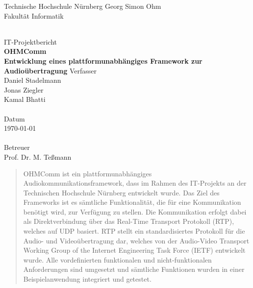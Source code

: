 \documentclass[11pt,a4paper]{report}
\begin{document}
\begin{titlepage}
  \begin{center}
    \parbox[t]{14cm}{
		\centering
      {\selectfont
			\Large
				Technische Hochschule Nürnberg Georg Simon Ohm \\
				Fakultät Informatik
			}
	}
	\\[3cm]
    \vfill    
    {\selectfont \huge IT-Projektbericht} \\[0.5cm]
    {\selectfont \LARGE \bfseries OHMComm \\ Entwicklung eines plattformunabhängiges Framework zur Audioübertragung}
    \vfill
    {
			\selectfont
      Verfasser \\ \large Daniel Stadelmann \\ Jonas Ziegler \\ Kamal Bhatti \\ \mbox{ } \\
      \normalsize Datum \\ \large \today \\ \mbox{ } \\
      \normalsize Betreuer \\ \large Prof. Dr. M. Teßmann \\
    } 
\end{center}
\end{titlepage}

\cleardoublepage

\begin{abstract} 
OHMComm ist ein plattformunabhängiges Audiokommunikationsframework, dass im Rahmen des IT-Projekts an der Technischen Hochschule Nürnberg entwickelt wurde. Das Ziel des Frameworks ist es sämtliche Funktionalität, die für eine Kommunikation benötigt wird, zur Verfügung zu stellen. Die Kommunikation erfolgt dabei als Direktverbindung über das Real-Time Transport Protokoll (RTP), welches auf UDP basiert. RTP stellt ein standardisiertes Protokoll für die Audio- und Videoübertragung dar, welches von der Audio-Video Transport Working Group of the Internet Engineering Task Force (IETF) entwickelt wurde. Alle vordefinierten funktionalen und nicht-funktionalen Anforderungen sind umgesetzt und sämtliche Funktionen wurden in einer Beispielanwendung integriert und getestet.


\end{abstract}
\end{document}
